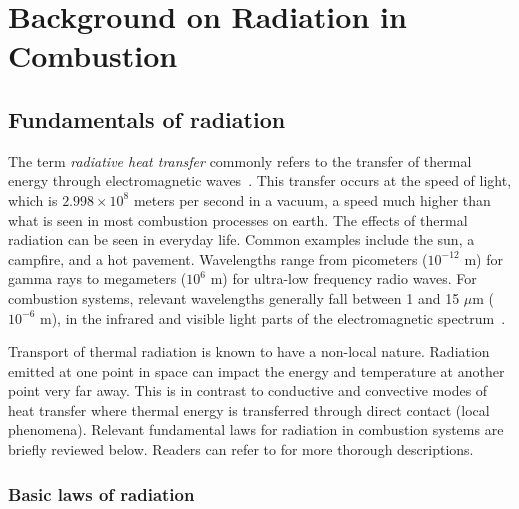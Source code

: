 \addchapheadtotoc
\chapter{Background on Radiation in Combustion}\label{chapter:Importance}

\section{Fundamentals of radiation} \label{Sec:FundOfRad}
The term \textit{radiative heat transfer} commonly refers to the transfer of thermal energy through electromagnetic waves~\cite{Modest2022ChapterRadiation}.
This transfer occurs at the speed of light, which is $2.998 \times 10^8$ meters per second in a vacuum, a speed much higher than what is seen in most combustion processes on earth.
The effects of thermal radiation can be seen in everyday life. Common examples include the sun, a campfire, and a hot pavement. 
Wavelengths range from picometers ($10^{-12}$ m) for gamma rays to megameters ($10^6$ m) for ultra-low frequency radio waves.
For combustion systems, relevant wavelengths generally fall between 1 and 15 $\mu{}$m ($10^{-6}$ m), in the infrared and visible light parts of the electromagnetic spectrum~\cite{Liu2020TheFlames}.

Transport of thermal radiation is known to have a non-local nature. Radiation emitted at one point in space can impact the energy and temperature at another point very far away. 
This is in contrast to conductive and convective modes of heat transfer where thermal energy is transferred through direct contact (local phenomena). 
Relevant fundamental laws for radiation in combustion systems are briefly reviewed below.
Readers can refer to \cite{Howell2010ThermalTransfer,Modest2013RadiativeTransfer} for more thorough descriptions.

\subsection{Basic laws of radiation}\label{section:BasicLaws}

